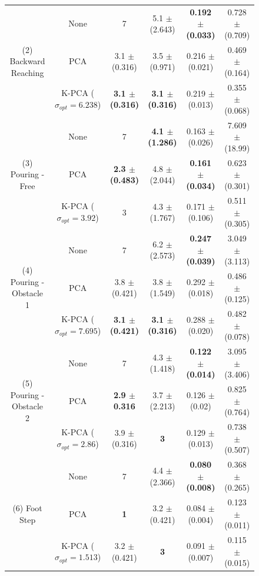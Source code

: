 \documentclass[letterpaper, 10 pt, conference,fleqn]{ieeeconf}
\begin{document}
\begin{figure}[!ht]
\begin{minipage}[b]{0.69\textwidth}
{\begin{tabular}{cc|cc|cc}
	\multicolumn{1}{c}{\multirow{3}{*}{(2) Backward Reaching}} & None & 7 & 5.1 $\pm$ (2.643) &\textbf{ 0.192 $\pm$ (0.033)} &  \cellcolor{blue!5} 0.728 $\pm$ (0.709)  \\
		    \multicolumn{1}{c}{\multirow{3}{*}{($N=11,M=1223$)}} & PCA & 3.1 $\pm$ (0.316) & 3.5 $\pm$ (0.971) & 0.216 $\pm$ (0.021) & \cellcolor{blue!10} 0.469 $\pm$ (0.164) \\	
			& K-PCA ($\sigma_{opt} = 6.238$) & \textbf{3.1 $\pm$ (0.316)} & \textbf{3.1 $\pm$ (0.316)} & 0.219 $\pm$ (0.013) & \cellcolor{blue!15} 0.355 $\pm$ (0.068)   \\
			\hline
		
	\multicolumn{1}{c}{\multirow{3}{*}{(3) Pouring - Free}} & None & 7 & \textbf{ 4.1 $\pm$ (1.286)} & 0.163 $\pm$ (0.026) & 7.609 $\pm$ (18.99) \\
   \multicolumn{1}{c}{\multirow{3}{*}{($N=9,M=1032$)}} & PCA & \textbf{ 2.3 $\pm$ (0.483)} & 4.8 $\pm$ (2.044) & \textbf{ 0.161 $\pm$ (0.034) } & \cellcolor{blue!10} 0.623 $\pm$ (0.301) \\	
	& K-PCA ($\sigma_{opt} = 3.92$) & 3 & 4.3 $\pm$ (1.767) & 0.171 $\pm$ (0.106) & \cellcolor{blue!15} 0.511 $\pm$ (0.305)   \\
				\hline
	\multicolumn{1}{c}{\multirow{3}{*}{(4) Pouring - Obstacle 1}} & None & 7 & 6.2 $\pm$ (2.573) & \textbf{0.247 $\pm$ (0.039)} & 3.049 $\pm$ (3.113) \\
   \multicolumn{1}{c}{\multirow{3}{*}{($N=11,M=1232$)}} & PCA & 3.8 $\pm$ (0.421) & 3.8 $\pm$ (1.549) & 0.292 $\pm$ (0.018) & \cellcolor{blue!10} 0.486 $\pm$ (0.125) \\	
				& K-PCA ($\sigma_{opt} = 7.695$) & \textbf{ 3.1 $\pm$ (0.421) } & \textbf{ 3.1 $\pm$ (0.316) } & 0.288 $\pm$ (0.020) & \cellcolor{blue!15} 0.482 $\pm$ (0.078)   \\
				\hline	

	\multicolumn{1}{c}{\multirow{3}{*}{(5) Pouring - Obstacle 2}} & None & 7 & 4.3 $\pm$ (1.418) & \textbf{ 0.122 $\pm$ (0.014) } & 3.095 $\pm$ (3.406) \\
   \multicolumn{1}{c}{\multirow{3}{*}{($N=7,M=1406$)}} & PCA & \textbf{ 2.9 $\pm$ 0.316 } & 3.7 $\pm$ (2.213) & 0.126 $\pm$ (0.02) & \cellcolor{blue!10} 0.825 $\pm$ (0.764) \\	
	& K-PCA ($\sigma_{opt} = 2.86$) & 3.9 $\pm$ (0.316) & \textbf{3} & 0.129 $\pm$ (0.013) & \cellcolor{blue!15} 0.738 $\pm$ (0.507)  \\
				\hline

	\multicolumn{1}{c}{\multirow{3}{*}{(6) Foot Step}} & None & 7 & 4.4 $\pm$ (2.366) & \textbf{ 0.080 $\pm$ (0.008) } & 0.368 $\pm$ (0.265)  \\
	\multicolumn{1}{c}{\multirow{3}{*}{($N=8,M=1058$)}} & PCA & \textbf{1} & 3.2 $\pm$ (0.421) & 0.084 $\pm$ (0.004) & \cellcolor{blue!10}  0.123 $\pm$ (0.011) \\	
	& K-PCA ($\sigma_{opt} = 1.513$) & 3.2 $\pm$ (0.421) & \textbf{3} &  0.091 $\pm$ (0.007) & \cellcolor{blue!15} 0.115 $\pm$ (0.015)   \\
				\hline		
	

\end{tabular}}
\end{minipage}
\end{figure}
\end{document}
